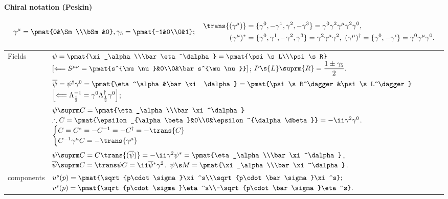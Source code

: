 \paragraph{Chiral notation (Peskin)}
\begin{equation*}
 \Gm=\pmat{0&\Sm\\\bSm&0}, \G5=\pmat{-1&0\\0&1};\quad
\begin{aligned}
\trans{(\Gm)}&=\{\G0,-\G1,\G2,-\G3\} = \G0\G2\Gm\G2\G0,\\
(\Gm)^*&=\{\G0,\G1,-\G2,\G3\} = \G2\Gm\G2,
~(\Gm)^\dagger= \{\G0,-\gamma^i\} = \G0\Gm\G0.
\end{aligned}
\end{equation*}
\begin{tabular}{l@{ :\ \ }l}
Fields &
   $\psi    =\pmat{\xi_\alpha\\\bar\eta^\dalpha}=\pmat{\psi\s L\\\psi\s R}$
   $\left[\Longleftarrow S^{\mu\nu}=\pmat{s^{\mu\nu}&0\\0&\bar s^{\mu\nu}}\right]$; \quad
   $P{}\s{L}\suprm{R}=\dfrac{1\pm\G5}2.$
\\&
   $\overline\psi=\psi^\dagger\G0=\pmat{\eta^\alpha&\bar\xi_\dalpha} = \pmat{\psi\s R^\dagger&\psi\s L^\dagger}$
   $\left[\Longleftarrow \Lambda_{\frac12}^{-1}=\G0\Lambda_{\frac12}^\dagger\G0\right]$;
\\&
   $\psi\suprm C=\pmat{\eta_\alpha\\\bar\xi^\dalpha}$
   \quad
   $\therefore C=\pmat{\epsilon_{\alpha\beta}&0\\0&\epsilon^{\dalpha\dbeta}}=-\ii\G2\G0$.~~
   $\begin{cases}
     C=C^*=-C^{-1}=-C^\dagger=-\trans{C}\\
     C^{-1}\Gm C=-\trans{\Gm}
   \end{cases}$
\\&
   $\psi\suprm C=C\trans{(\overline\psi)}=-\ii\G2\psi^*=\pmat{\eta_\alpha\\\bar\xi^\dalpha}$,
   $\overline\psi{}\suprm C=\trans\psi C=\ii\overline\psi{}^*\G2$.
   \qquad
   $\psi\s M=\pmat{\xi_\alpha\\\bar\xi^\dalpha}$.\\
components&\parbox[t]{10.4em}{
$u^s(p)=\pmat{\sqrt{p\cdot\sigma}\xi^s\\\sqrt{p\cdot\bar\sigma}\xi^s};$\\
 $v^s(p)=\pmat{\sqrt{p\cdot\sigma}\eta^s\\-\sqrt{p\cdot\bar\sigma}\eta^s}.$
}\hspace{0em}

\end{tabular}
